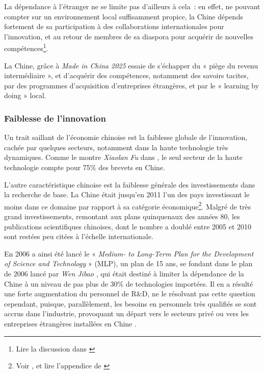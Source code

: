 \documentclass[a4paper]{article}
\begin{document}
La dépendance à l’étranger ne se limite pas d’ailleurs à cela~: en effet, ne pouvant compter sur un environnement local suffisamment propice, la Chine dépends fortement de sa participation à des collaborations internationales pour l’innovation, et au retour de membres de sa diaspora pour acquérir de nouvelles compétences\footnote{Lire la discussion dans \cite{xiaolan15_chinas}}.

La Chine, grâce à \textit{Made in China 2025} essaie de s’échapper du « piège du revenu intermédiaire », et d’acquérir des compétences, notamment des savoirs tacites, par des programmes d’acquisition d’entreprises étrangères, et par le « learning by doing » local.

\subsubsection{Faiblesse de l’innovation}
\label{sec:orga58cd43}
Un trait saillant de l’économie chinoise est la faiblesse globale de l’innovation, cachée par quelques secteurs, notamment dans la haute technologie très dynamiques. Comme le montre \textit{Xiaolan Fu} dans \cite{xiaolan15_chinas}, le seul secteur de la haute technologie compte pour 75\% des brevets en Chine.

L’autre caractéristique chinoise est la faiblesse générale des investissements dans la recherche de base. La Chine était jusqu’en 2011 l’un des pays investissant le moins dans ce domaine par rapport à sa catégorie économique\footnote{Voir \cite{xiaolan15_chinas}, et lire l’appendice de \cite{simon09_chinas}}. Malgré de très grand investissements, remontant aux plans quinquenaux des années 80, les publications scientifiques chinoises, dont le nombre a doublé entre 2005 et 2010 sont restées peu citées à l’échelle internationale.

En 2006 a ainsi été lancé le « \textit{Medium- to Long-Term Plan for the Development of Science and Technology} » (MLP), un plan de 15 ans, se fondant dans le plan de 2006 lancé par \textit{Wen Jibao} \cite{cao06_chinas_scien_techn_plan}, qui était destiné à limiter la dépendance de la Chine à un niveau de pas plus de 30\% de technologies importées. Il en a résulté une forte augmentation du personnel de R\&D, ne le résolvant pas cette question cependant, puisque, parallèlement, les besoins en personnels très qualifiés se sont accrus dans l’industrie, provoquant un départ vers le secteurs privé ou vers les entreprises étrangères installées en Chine \cite{simon09_chinas}.
\end{document}
